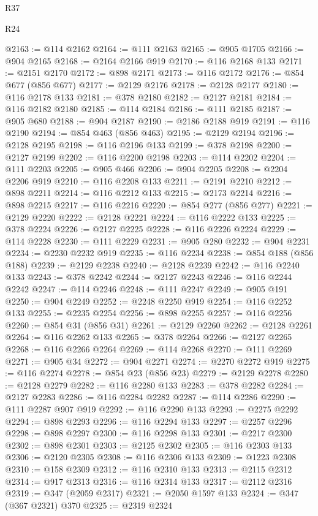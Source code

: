 \begin{lexlean}{R37}
\begin{lexlean}{R24}
\begin{coremodule}
{{{{{{{{{{{{{{{{{{{{{{{{{{{{{{{{{{{{{{{{{{{{{{{{{{{{{{{{{{{{{{{{{{{{{{{{{{{{{{{{{{{{{{{{{{{{{{{{{{{{{{{{{{{{{{{{{{{{{{{{{{{{{{{{{{{{{{{{{{{{{{{{{{{{{{{{{{{{{{{{{{{{{{{{{{{{{{{{{{{{{{{{{@2163 := @114 @2162
@2164 := @111 @2163
@2165 := @905 @1705
@2166 := @904 @2165
@2168 := @2164 @2166 @919
@2170 := @116 @2168 @133
@2171 := @2151 @2170
@2172 := @898 @2171
@2173 := @116 @2172
@2176 := @854 @677 (@856 @677)
@2177 := @2129 @2176
@2178 := @2128 @2177
@2180 := @116 @2178 @133
@2181 := @378 @2180
@2182 := @2127 @2181
@2184 := @116 @2182 @2180
@2185 := @114 @2184
@2186 := @111 @2185
@2187 := @905 @680
@2188 := @904 @2187
@2190 := @2186 @2188 @919
@2191 := @116 @2190
@2194 := @854 @463 (@856 @463)
@2195 := @2129 @2194
@2196 := @2128 @2195
@2198 := @116 @2196 @133
@2199 := @378 @2198
@2200 := @2127 @2199
@2202 := @116 @2200 @2198
@2203 := @114 @2202
@2204 := @111 @2203
@2205 := @905 @466
@2206 := @904 @2205
@2208 := @2204 @2206 @919
@2210 := @116 @2208 @133
@2211 := @2191 @2210
@2212 := @898 @2211
@2214 := @116 @2212 @133
@2215 := @2173 @2214
@2216 := @898 @2215
@2217 := @116 @2216
@2220 := @854 @277 (@856 @277)
@2221 := @2129 @2220
@2222 := @2128 @2221
@2224 := @116 @2222 @133
@2225 := @378 @2224
@2226 := @2127 @2225
@2228 := @116 @2226 @2224
@2229 := @114 @2228
@2230 := @111 @2229
@2231 := @905 @280
@2232 := @904 @2231
@2234 := @2230 @2232 @919
@2235 := @116 @2234
@2238 := @854 @188 (@856 @188)
@2239 := @2129 @2238
@2240 := @2128 @2239
@2242 := @116 @2240 @133
@2243 := @378 @2242
@2244 := @2127 @2243
@2246 := @116 @2244 @2242
@2247 := @114 @2246
@2248 := @111 @2247
@2249 := @905 @191
@2250 := @904 @2249
@2252 := @2248 @2250 @919
@2254 := @116 @2252 @133
@2255 := @2235 @2254
@2256 := @898 @2255
@2257 := @116 @2256
@2260 := @854 @31 (@856 @31)
@2261 := @2129 @2260
@2262 := @2128 @2261
@2264 := @116 @2262 @133
@2265 := @378 @2264
@2266 := @2127 @2265
@2268 := @116 @2266 @2264
@2269 := @114 @2268
@2270 := @111 @2269
@2271 := @905 @34
@2272 := @904 @2271
@2274 := @2270 @2272 @919
@2275 := @116 @2274
@2278 := @854 @23 (@856 @23)
@2279 := @2129 @2278
@2280 := @2128 @2279
@2282 := @116 @2280 @133
@2283 := @378 @2282
@2284 := @2127 @2283
@2286 := @116 @2284 @2282
@2287 := @114 @2286
@2290 := @111 @2287 @907 @919
@2292 := @116 @2290 @133
@2293 := @2275 @2292
@2294 := @898 @2293
@2296 := @116 @2294 @133
@2297 := @2257 @2296
@2298 := @898 @2297
@2300 := @116 @2298 @133
@2301 := @2217 @2300
@2302 := @898 @2301
@2303 := @2125 @2302
@2305 := @116 @2303 @133
@2306 := @2120 @2305
@2308 := @116 @2306 @133
@2309 := @1223 @2308
@2310 := @158 @2309
@2312 := @116 @2310 @133
@2313 := @2115 @2312
@2314 := @917 @2313
@2316 := @116 @2314 @133
@2317 := @2112 @2316
@2319 := @347 (@2059 @2317)
@2321 := @2050 @1597 @133
@2324 := @347 (@367 @2321) @370
@2325 := @2319 @2324
}}}}}}}}}}}}}}}}}}}}}}}}}}}}}}}}}}}}}}}}}}}}}}}}}}}}}}}}}}}}}}}}}}}}}}}}}}}}}}}}}}}}}}}}}}}}}}}}}}}}}}}}}}}}}}}}}}}}}}}}}}}}}}}}}}}}}}}}}}}}}}}}}}}}}}}}}}}}}}}}}}}}}}}}}}}}}}}}}}}}}}}}}
\end{coremodule}
\end{lexlean}
\end{lexlean}
